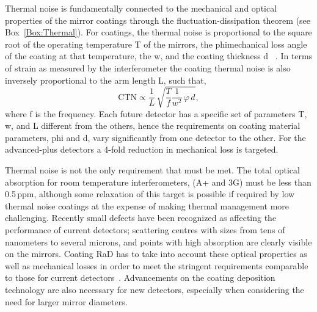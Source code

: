 Thermal noise is fundamentally connected to the mechanical and optical properties of the mirror coatings through the fluctuation-dissipation theorem (see Box~\ref{Box:Thermal}). For coatings, the thermal noise is proportional to the square root of the operating temperature \ac{T} of the mirrors, the \ac{phi}mechanical loss angle   of the coating at that temperature, the \ac{w}, and the coating thickness \ac{d} ~\cite{levin1998internal}. In terms of strain as measured by the interferometer the coating thermal noise is also inversely proportional to the arm length \ac{L}, such that,
\begin{equation}
\text{CTN} \propto \frac{1}{L} \, \sqrt{\frac{T}{f} \frac{1}{w^2} \, \varphi \, d   },
\end{equation}\label{eq:CTN}
where \ac{f} is the frequency. Each future detector has a specific set of parameters \ac{T}, \ac{w}, and \ac{L} different from the others, hence the requirements on coating material parameters, \ac{phi} and \ac{d}, vary significantly from one detector to the other. For the advanced-plus detectors a 4-fold reduction in mechanical loss is targeted.


Thermal noise is not the only requirement that must be met. The total optical absorption for room temperature interferometers, (\ac{A+} and \ac{3G}) must be less than 0.5\,ppm, although some relaxation of this target is possible if required by low thermal noise coatings at the expense of making thermal management more challenging. Recently small defects have been recognized as affecting the performance of current detectors; scattering centres with sizes from tens of nanometers to several microns, and points with high absorption are clearly visible on the mirrors. Coating \ac{RaD}   has to take into account these optical properties as well as mechanical losses in order to meet the stringent requirements comparable to those for current detectors~\cite{AdvancedLIGO2015,AdvancedVirgo2015}. Advancements on the coating deposition technology are also necessary for new detectors, especially when considering the need for larger mirror diameters. 

